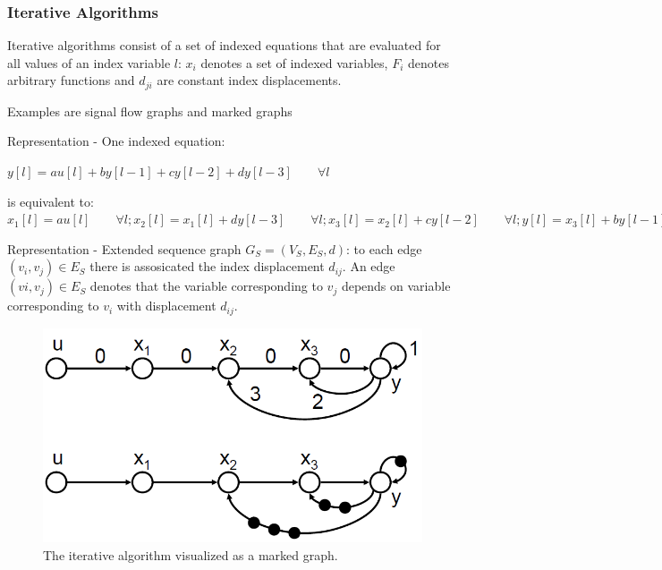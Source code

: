 \subsubsection{Iterative Algorithms}

\begin{definition}
Iterative algorithms consist of a set of indexed equations that are evaluated for all values of an index variable $l$:
	$x_i$ denotes a set of indexed variables, $F_i$ denotes arbitrary functions and $d_{ji}$ are constant index displacements.
\end{definition}

\begin{example}
Examples are signal flow graphs and marked graphs
\end{example}


Representation - One indexed equation:

$y[l] = a u[l] + b y[l-1] + c y[l-2] + d y[l-3] \qquad \forall l$

is equivalent to:
$x_1[l] = a u[l] \qquad \forall l ; x_2[l] = x_1[l] + d y[l-3] \qquad \forall l ; x_3[l] = x_2[l] + c y[l-2] \qquad \forall l ; y[l] = x_3[l] + b y [l-1] \qquad \forall l$


Representation - Extended sequence graph
$G_S = (V_S, E_S, d)$: to each edge $(v_i, v_j) \in E_S$ there is assosicated the index displacement $d_{ij}$. An edge $(vi, v_j) \in E_S$ denotes that the variable corresponding to $v_j$ depends on variable corresponding to $v_i$ with displacement $d_{ij}$.



\begin{figure}[ht]
	\centering
  	\includegraphics[scale=0.4]{img/11_iterativ_as_marked_graph.png}
	\caption{The iterative algorithm visualized as a marked graph.}
	\label{fig:iterative_as_marked_graph}
\end{figure}

